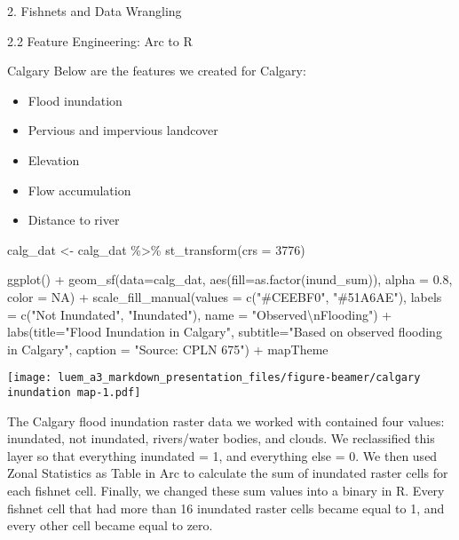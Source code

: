 \documentclass[
  ignorenonframetext,
]{beamer}
\newenvironment{Shaded}{\begin{snugshade}}{\end{snugshade}}
\newcommand{\AttributeTok}[1]{\textcolor[rgb]{0.77,0.63,0.00}{#1}}
\newcommand{\ConstantTok}[1]{\textcolor[rgb]{0.00,0.00,0.00}{#1}}
\newcommand{\DecValTok}[1]{\textcolor[rgb]{0.00,0.00,0.81}{#1}}
\newcommand{\FloatTok}[1]{\textcolor[rgb]{0.00,0.00,0.81}{#1}}
\newcommand{\FunctionTok}[1]{\textcolor[rgb]{0.00,0.00,0.00}{#1}}
\newcommand{\NormalTok}[1]{#1}
\newcommand{\OtherTok}[1]{\textcolor[rgb]{0.56,0.35,0.01}{#1}}
\newcommand{\SpecialCharTok}[1]{\textcolor[rgb]{0.00,0.00,0.00}{#1}}
\newcommand{\StringTok}[1]{\textcolor[rgb]{0.31,0.60,0.02}{#1}}
\providecommand{\tightlist}{%
  \setlength{\itemsep}{0pt}\setlength{\parskip}{0pt}}
\begin{document}
\begin{frame}[fragile]{2. Fishnets and Data Wrangling}
\begin{block}{2.2 Feature Engineering: Arc to R}
\begin{block}{Calgary}
\protect\hypertarget{calgary}{}
Below are the features we created for Calgary:

\begin{itemize}
\tightlist
\item
  Flood inundation
\item
  Pervious and impervious landcover
\item
  Elevation
\item
  Flow accumulation
\item
  Distance to river
\end{itemize}

\begin{Shaded}
\begin{Highlighting}[]
\NormalTok{calg\_dat }\OtherTok{\textless{}{-}}\NormalTok{ calg\_dat }\SpecialCharTok{\%\textgreater{}\%}
  \FunctionTok{st\_transform}\NormalTok{(}\AttributeTok{crs =} \DecValTok{3776}\NormalTok{)}

\FunctionTok{ggplot}\NormalTok{() }\SpecialCharTok{+}
  \FunctionTok{geom\_sf}\NormalTok{(}\AttributeTok{data=}\NormalTok{calg\_dat, }\FunctionTok{aes}\NormalTok{(}\AttributeTok{fill=}\FunctionTok{as.factor}\NormalTok{(inund\_sum)), }\AttributeTok{alpha =} \FloatTok{0.8}\NormalTok{, }\AttributeTok{color =} \ConstantTok{NA}\NormalTok{) }\SpecialCharTok{+}
  \FunctionTok{scale\_fill\_manual}\NormalTok{(}\AttributeTok{values =} \FunctionTok{c}\NormalTok{(}\StringTok{"\#CEEBF0"}\NormalTok{, }\StringTok{"\#51A6AE"}\NormalTok{),}
                    \AttributeTok{labels =} \FunctionTok{c}\NormalTok{(}\StringTok{"Not Inundated"}\NormalTok{, }\StringTok{"Inundated"}\NormalTok{),}
                    \AttributeTok{name =} \StringTok{"Observed}\SpecialCharTok{\textbackslash{}n}\StringTok{Flooding"}\NormalTok{) }\SpecialCharTok{+}
  \FunctionTok{labs}\NormalTok{(}\AttributeTok{title=}\StringTok{"Flood Inundation in Calgary"}\NormalTok{,}
       \AttributeTok{subtitle=}\StringTok{"Based on observed flooding in Calgary"}\NormalTok{,}
        \AttributeTok{caption =} \StringTok{"Source: CPLN 675"}\NormalTok{) }\SpecialCharTok{+}
\NormalTok{  mapTheme}
\end{Highlighting}
\end{Shaded}

\texttt{[image: luem\_a3\_markdown\_presentation\_files/figure-beamer/calgary inundation map-1.pdf]}

The Calgary flood inundation raster data we worked with contained four
values: inundated, not inundated, rivers/water bodies, and clouds. We
reclassified this layer so that everything inundated = 1, and everything
else = 0. We then used Zonal Statistics as Table in Arc to calculate the
sum of inundated raster cells for each fishnet cell. Finally, we changed
these sum values into a binary in R. Every fishnet cell that had more
than 16 inundated raster cells became equal to 1, and every other cell
became equal to zero.


\end{block}
\end{block}
\end{frame}
\end{document}
